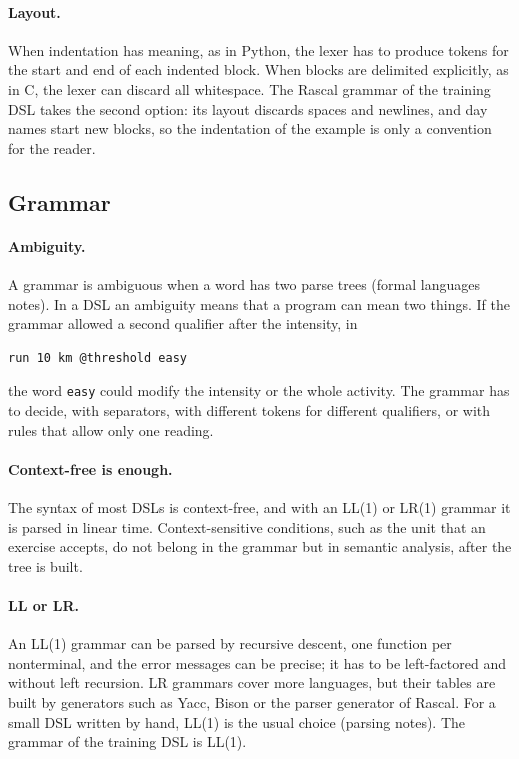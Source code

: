 \paragraph{Layout.} When indentation has meaning, as in Python, the lexer
has to produce tokens for the start and end of each indented block. When
blocks are delimited explicitly, as in C, the lexer can discard all
whitespace. The Rascal grammar of the training DSL takes the second option:
its layout discards spaces and newlines, and day names start new blocks, so
the indentation of the example is only a convention for the reader.

\subsection{Grammar}

\paragraph{Ambiguity.} A grammar is ambiguous when a word has two parse trees
(formal languages notes). In a DSL an ambiguity means that a program can mean
two things. If the grammar allowed a second qualifier after the intensity, in
\begin{lstlisting}
run 10 km @threshold easy
\end{lstlisting}
the word \texttt{easy} could modify the intensity or the whole activity. The
grammar has to decide, with separators, with different tokens for different
qualifiers, or with rules that allow only one reading.

\paragraph{Context-free is enough.} The syntax of most DSLs is context-free,
and with an LL(1) or LR(1) grammar it is parsed in linear time.
Context-sensitive conditions, such as the unit that an exercise accepts, do
not belong in the grammar but in semantic analysis, after the tree is built.

\paragraph{LL or LR.} An LL(1) grammar can be parsed by recursive descent, one
function per nonterminal, and the error messages can be precise; it has to be
left-factored and without left recursion. LR grammars cover more languages,
but their tables are built by generators such as Yacc, Bison or the parser
generator of Rascal. For a small DSL written by hand, LL(1) is the usual
choice (parsing notes). The grammar of the training DSL is LL(1).

